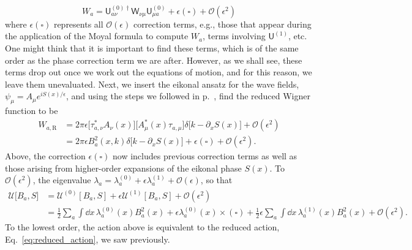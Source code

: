 %
\begin{equation}
  W_{a} = \mathsf{U}^{(0)\dagger}_{a\nu}\mathsf{W}_{\nu\mu}\mathsf{U}^{(0)}_{\mu a} + \epsilon(\square) + \mathcal{O}(\epsilon^{2})
\end{equation}
%
where $\epsilon(\square)$ represents all $\mathcal{O}(\epsilon)$ correction terms, e.g., those that appear during the application of the Moyal formula to compute $W_{a}$, terms involving $\mathsf{U}^{(1)}$, etc.
One might think that it is important to find these terms, which is of the same order as the phase correction term we are after.
However, as we shall see, these terms drop out once we work out the equations of motion, and for this reason, we leave them unevaluated.
Next, we insert the eikonal ansatz for the wave fields, $\psi_{\mu} = A_{\mu}e^{iS(x)/\epsilon}$, and using the steps we followed in p.~\pageref{page:redaction}, find the reduced Wigner function to be
%
\begin{equation}
  \begin{aligned}
    W_{a,\text{R}} &= 2\pi \epsilon\big[\tau_{a,\nu}^{*} A_{\nu}(x)\big]\big[A^{*}_{\mu}(x)\tau_{a,\mu}\big]\delta\big[k - \partial_{x}S(x)\big] + \mathcal{O}(\epsilon^{2})\\
                   &= 2\pi\epsilon {B^{2}_{a}}(x, k)\delta\big[k - \partial_{x}S(x)\big] + \epsilon(\square) + \mathcal{O}(\epsilon^{2}).
  \end{aligned}
\end{equation}
%
Above, the correction $\epsilon(\square)$ now includes previous correction terms as well as those arising from higher-order expansions of the eikonal phase $S(x)$.
To $\mathcal{O}(\epsilon^{2})$, the eigenvalue $\lambda_{a} = \lambda_{a}^{(0)} + \epsilon\lambda_{a}^{(1)} + \mathcal{O}(\epsilon)$, so that
%
\begin{equation}
  \begin{aligned}
    \mathscr{U}\big[B_{a}, S\big] &= \mathscr{U}^{(0)}\left[B_{a}, S\right] + \epsilon\mathscr{U}^{(1)}\left[B_{a}, S\right] + \mathcal{O}(\epsilon^{2})\\
                                  &= \tfrac{1}{2} \sum_{a} \int \dd{x}\, \lambda_{a}^{(0)}(x)B^{2}_{a}(x) + \epsilon\lambda_{a}^{(0)}(x)\times(\square) + \tfrac{1}{2}\epsilon\sum_{a}\int\dd{x}\,\lambda_{a}^{(1)}(x)B^{2}_{a}(x) + \mathcal{O}(\epsilon^{2}).
  \end{aligned}
  \label{eq:action_ho}
\end{equation}
%
To the lowest order, the action above is equivalent to the reduced action, Eq.~\eqref{eq:reduced_action}, we saw previously.
